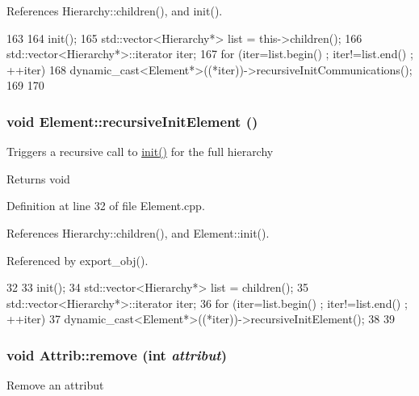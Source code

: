 References Hierarchy::children(), and init().


\begin{DoxyCode}
163                                             {
164   init();
165   std::vector<Hierarchy*> list = this->children();
166   std::vector<Hierarchy*>::iterator iter;
167   for (iter=list.begin() ; iter!=list.end() ; ++iter){
168     dynamic_cast<Element*>((*iter))->recursiveInitCommunications();
169   }
170 }
\end{DoxyCode}
\hypertarget{classElement_a3c0abcb36f8906688bb7e32608df7086}{
\subsubsection[{recursiveInitElement}]{\setlength{\rightskip}{0pt plus 5cm}void Element::recursiveInitElement ()}}
\label{classElement_a3c0abcb36f8906688bb7e32608df7086}
Triggers a recursive call to \hyperlink{classElement_af42754b5cabc198869222725218d695c}{init()} for the full hierarchy

\begin{DoxyReturn}{Returns}
void 
\end{DoxyReturn}


Definition at line 32 of file Element.cpp.

References Hierarchy::children(), and Element::init().

Referenced by export\_\-obj().


\begin{DoxyCode}
32                                   {
33   init();
34   std::vector<Hierarchy*> list = children();
35   std::vector<Hierarchy*>::iterator iter;
36   for (iter=list.begin() ; iter!=list.end() ; ++iter){
37     dynamic_cast<Element*>((*iter))->recursiveInitElement();
38   }
39 }
\end{DoxyCode}
\hypertarget{classAttrib_a7d4ef7e32d93cb287792b87b857e79f3}{
\subsubsection[{remove}]{\setlength{\rightskip}{0pt plus 5cm}void Attrib::remove (int {\em attribut})}}
\label{classAttrib_a7d4ef7e32d93cb287792b87b857e79f3}
Remove an attribut 

